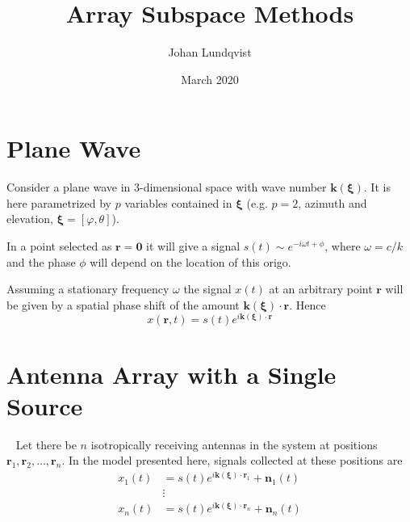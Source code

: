 \documentclass[11pt]{article}
\title{Array Subspace Methods}
\author{Johan Lundqvist}
\date{March 2020}
\renewcommand{\vct}[1]{\boldsymbol{#1}}
\begin{document}
\maketitle

\section{Plane Wave}
\label{sec:plane-wave}
Consider a plane wave in 3-dimensional space with wave number $\vct{k}(\vct{\xi})$.
It is here parametrized by $p$ variables contained in $\vct{\xi}$ (e.g. $p=2$, azimuth and elevation, $\vct{\xi}=[\varphi, \theta]$).

In a point selected as $\vct{r}=\vct{0}$ it will give a signal $s(t)\sim e^{-i\omega t+\phi}$, where $\omega=c/k$ and the phase $\phi$ will depend on the location of this origo.

Assuming a stationary frequency $\omega$ the signal $x(t)$ at an arbitrary point $\vct{r}$ will be given by a spatial phase shift of the amount ${\vct{k}(\vct{\xi})}\cdot{\vct{r}}$.
Hence
\begin{equation}
    x(\vct{r},t) = s(t)e^{i{\vct{k}(\vct{\xi})}\cdot{\vct{r}}}
\end{equation}

\section{Antenna Array with a Single Source}
\label{sec:antenna-array-with-a-single-source}
~\cite{Paulraj2016SubspaceMF,GonenMendel}
Let there be $n$ isotropically receiving antennas in the system at positions $\vct{r}_1, \vct{r}_2, \dots, \vct{r}_n$.
In the model presented here, signals collected at these positions are
\begin{equation}
    \begin{split}
        x_1(t)& = s(t)e^{i{\vct{k}(\vct{\xi})}\cdot{\vct{r}_1}} + \vct{n}_1(t)\\
        &\vdots\\
        x_n(t)& = s(t)e^{i{\vct{k}(\vct{\xi})}\cdot{\vct{r}_n}} + \vct{n}_n(t)
    \end{split}
\end{equation}
\end{document}
